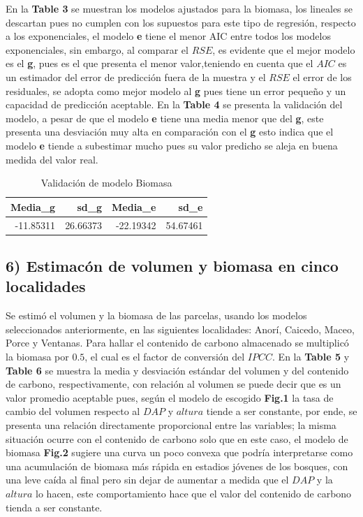 \documentclass[9pt,onecolumn,twoside,]{pinp}
\begin{document}
En la \textbf{Table 3} se muestran los modelos ajustados para la
biomasa, los lineales se descartan pues no cumplen con los supuestos
para este tipo de regresión, respecto a los exponenciales, el modelo
\textbf{e} tiene el menor AIC entre todos los modelos exponenciales, sin
embargo, al comparar el \(RSE\), es evidente que el mejor modelo es el
\textbf{g}, pues es el que presenta el menor valor,teniendo en cuenta
que el \(AIC\) es un estimador del error de predicción fuera de la
muestra y el \(RSE\) el error de los residuales, se adopta como mejor
modelo al \textbf{g} pues tiene un error pequeño y un capacidad de
predicción aceptable. En la \textbf{Table 4} se presenta la validación
del modelo, a pesar de que el modelo \textbf{e} tiene una media menor
que del \textbf{g}, este presenta una desviación muy alta en comparación
con el \textbf{g} esto indica que el modelo \textbf{e} tiende a
subestimar mucho pues su valor predicho se aleja en buena medida del
valor real.

\begin{table}[h]

\caption{\label{tab:unnamed-chunk-25}Validación de modelo Biomasa}
\centering
\begin{tabular}[t]{r|r|r|r}
\hline
Media\_g & sd\_g & Media\_e & sd\_e\\
\hline
-11.85311 & 26.66373 & -22.19342 & 54.67461\\
\hline
\end{tabular}
\end{table}

\hypertarget{estimacuxf3n-de-volumen-y-biomasa-en-cinco-localidades}{%
\subsection{6) Estimacón de volumen y biomasa en cinco
localidades}\label{estimacuxf3n-de-volumen-y-biomasa-en-cinco-localidades}}

Se estimó el volumen y la biomasa de las parcelas, usando los modelos
seleccionados anteriormente, en las siguientes localidades: Anorí,
Caicedo, Maceo, Porce y Ventanas. Para hallar el contenido de carbono
almacenado se multiplicó la biomasa por \(0.5\), el cual es el factor de
conversión del \(IPCC\). En la \textbf{Table 5} y \textbf{Table 6} se
muestra la media y desviación estándar del volumen y del contenido de
carbono, respectivamente, con relación al volumen se puede decir que es
un valor promedio aceptable pues, según el modelo de escogido
\textbf{Fig.1} la tasa de cambio del volumen respecto al \(DAP\) y
\(altura\) tiende a ser constante, por ende, se presenta una relación
directamente proporcional entre las variables; la misma situación ocurre
con el contenido de carbono solo que en este caso, el modelo de biomasa
\textbf{Fig.2} sugiere una curva un poco convexa que podría
interpretarse como una acumulación de biomasa más rápida en estadios
jóvenes de los bosques, con una leve caída al final pero sin dejar de
aumentar a medida que el \(DAP\) y la \(altura\) lo hacen, este
comportamiento hace que el valor del contenido de carbono tienda a ser
constante.
\end{document}

